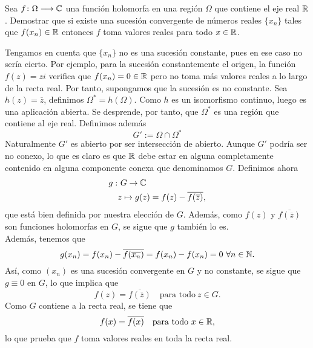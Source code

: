 \documentclass[twoside]{article}
\begin{document}
\begin{ejercicio}{5}
Sea $f\colon{\Omega}\longrightarrow{\mathbb{C}}$ una función holomorfa en una región $\Omega$ que contiene el eje real $\mathbb{R}$. Demostrar que si existe una sucesión convergente de números reales $\{x_n\}$ tales que $f(x_n)\in \mathbb{R}$ entonces $f$ toma valores reales para todo $x\in \mathbb{R}$.
\end{ejercicio}
\begin{solucion}
Tengamos en cuenta que $\{x_n\}$ no es una sucesión constante, pues en ese caso no sería cierto. Por ejemplo, para la sucesión constantemente el origen, la función $f(z)=zi$ verifica que $f(x_n)=0\in \mathbb{R}$ pero no toma más valores reales a lo largo de la recta real. Por tanto, supongamos que la sucesión es no constante. Sea $h(z)=\overline{z}$, definimos $\Omega^* = h(\Omega)$. Como $h$ es un isomorfismo continuo, luego es una aplicación abierta. Se desprende, por tanto, que $\Omega^*$ es una región que contiene al eje real. Definimos además
$$
G':=\Omega \cap \Omega^*
$$
Naturalmente $G'$ es abierto por ser intersección de abierto. Aunque $G'$ podría ser no conexo, lo que es claro es que $\mathbb{R}$ debe estar en alguna completamente contenido en alguna componente conexa que denominamos $G$. Definimos ahora \begin{equation*}\begin{split}
	g : & \  G \rightarrow \mathbb{C} \\
	& z \mapsto g(z) = f(z) - \overline{f(\overline{z})},
	\end{split}
	\end{equation*}
	que está bien definida por nuestra elección de $G$. Además, como $f(z)$ y $ \overline{f(\overline{z})}$ son funciones holomorfas en $G$, se sigue que $g$ también lo es. \\
	Además, tenemos que \begin{equation*}
	g(x_n) = f(x_n) - \overline{f(\overline{x_n})} = f(x_n) - f(x_n) = 0 \  \forall n \in \mathbb{N}.
	\end{equation*}
	Así, como $(x_n)$ es una sucesión convergente en $G$ y no constante, se sigue que $g \equiv 0$ en $G$, lo que implica que \begin{equation*}
	f(z) = \overline{f(\overline{z})} \quad \text{para todo} \ z \in G.
	\end{equation*}
	Como $G$ contiene a la recta real, se tiene que \begin{equation*}
	f(x) = \overline{f(x)} \quad \text{para todo} \ x \in \mathbb{R},
	\end{equation*}
	lo que prueba que $f$ toma valores reales en toda la recta real. 
\end{solucion}
\newpage
\end{document}
